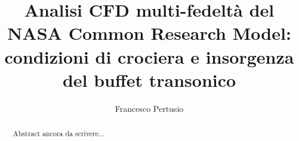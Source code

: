 \documentclass[binding=0.6cm]{sapthesis}
\title{Analisi CFD multi-fedeltà del NASA Common Research Model: condizioni di crociera e insorgenza del buffet transonico}
\author{Francesco Pertusio}
\begin{document}
\frontmatter
\maketitle
\dedication{A...} 

\begin{abstract}
Abstract ancora da scrivere...
\end{abstract}

\tableofcontents

\mainmatter






\backmatter
\cleardoublepage
{}
{}


\end{document}
